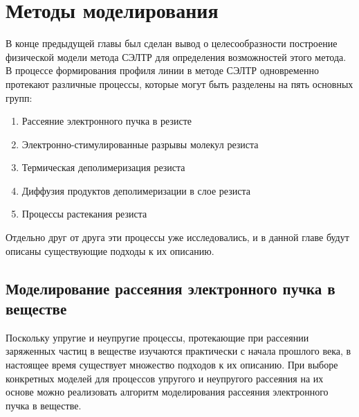\chapter{Методы моделирования}

В конце предыдущей главы был сделан вывод о целесообразности построение физической модели метода СЭЛТР для определения возможностей этого метода. В процессе формирования профиля линии в методе СЭЛТР одновременно протекают различные процессы, которые могут быть разделены на пять основных групп:
\begin{enumerate}
	\item Рассеяние электронного пучка в резисте
	\item Электронно-стимулированные разрывы молекул резиста
	\item Термическая деполимеризация резиста
	\item Диффузия продуктов деполимеризации в слое резиста
	\item Процессы растекания резиста
\end{enumerate}

Отдельно друг от друга эти процессы уже исследовались, и в данной главе будут описаны существующие подходы к их описанию.


\section{Моделирование рассеяния электронного пучка в веществе}
Поскольку упругие и неупругие процессы, протекающие при рассеянии заряженных частиц в веществе изучаются практически с начала прошлого века, в настоящее время существует множество подходов к их описанию. При выборе конкретных моделей для процессов упругого и неупругого рассеяния на их основе можно реализовать алгоритм моделирования рассеяния электронного пучка в веществе.








